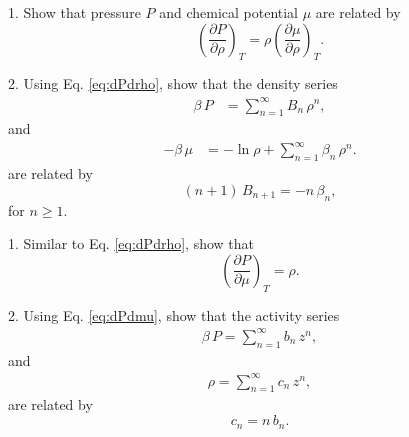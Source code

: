 \documentclass[12pt]{book}
\begin{document}







1. Show that pressure $P$ and chemical potential $\mu$ are related by
\begin{equation}
  \left(
    \frac{ \partial P } { \partial \rho }
  \right)_T
=
  \rho
  \left(
    \frac{ \partial \mu } { \partial \rho }
  \right)_T.
  \label{eq:dPdrho}
\end{equation}



2. Using Eq. \eqref{eq:dPdrho}, show that the density series
\begin{align*}
  \beta \, P
&=
  \sum_{n = 1}^\infty B_n \, \rho^n,
\end{align*}
and
\begin{align*}
  -\beta \, \mu
&=
  -\ln \rho + \sum_{n = 1}^\infty \beta_n \, \rho^n.
\end{align*}
are related by
\[
  (n + 1) \, B_{n+1} = -n \, \beta_n,
\]
for $n \ge 1$.





1. Similar to Eq. \eqref{eq:dPdrho}, show that
\begin{equation}
  \left(
    \frac{ \partial P } { \partial \mu }
  \right)_T
=
  \rho.
  \label{eq:dPdmu}
\end{equation}


2. Using Eq. \eqref{eq:dPdmu}, show that the activity series
\begin{align*}
  \beta \, P = \sum_{n = 1}^\infty b_n \, z^n,
\end{align*}
and
\begin{align*}
  \rho = \sum_{n = 1}^\infty c_n \, z^n,
\end{align*}
are related by
\[
  c_n
=
  n \, b_n.
\]
\end{document}
